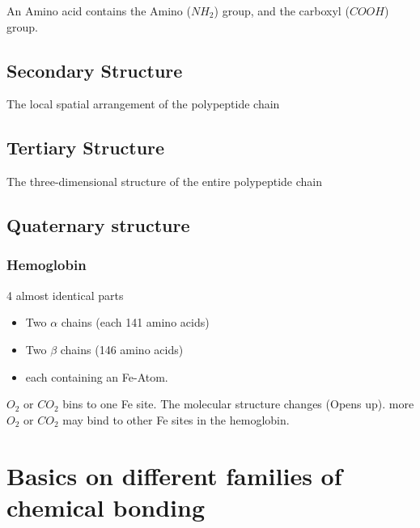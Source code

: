 \documentclass[]{scrartcl}
\begin{document}
An Amino acid contains the Amino ($NH_2$) group, and the carboxyl ($COOH$) group.

\subsection{Secondary Structure}
The local spatial arrangement of the polypeptide chain

\subsection{Tertiary Structure}
The three-dimensional structure of the entire polypeptide chain

\subsection{Quaternary structure}

\subsubsection{Hemoglobin}
4 almost identical parts
\begin{itemize}
	\item Two $\alpha$ chains (each 141 amino acids)
	\item Two $\beta$ chains (146 amino acids)
	\item each containing an Fe-Atom.
\end{itemize}
$O_2$ or $CO_2$ bins to one Fe site. The molecular structure changes (Opens up). more $O_2$ or $CO_2$ may bind to other Fe sites in the hemoglobin. 


\section{Basics on different families of chemical bonding}
\end{document}

